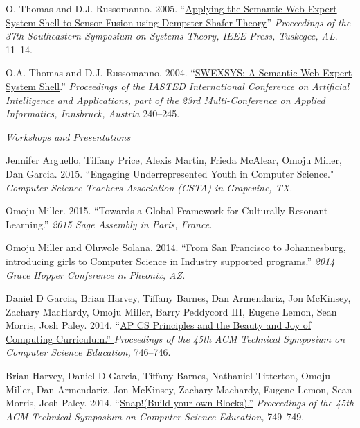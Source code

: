\documentclass[11pt,article,oneside]{memoir}
\begin{document}
\ind O. Thomas and D.J. Russomanno. 2005. ``\href{http://scholar.google.com/citations?view_op=view_citation&hl=en&user=E7z_wrwAAAAJ&citation_for_view=E7z_wrwAAAAJ:d1gkVwhDpl0C}{Applying the Semantic Web Expert System Shell to Sensor Fusion using Dempster-Shafer Theory.}'' \emph{Proceedings of the 37th Southeastern Symposium on Systems Theory, IEEE Press, Tuskegee, AL}. 11--14.

\ind O.A. Thomas and D.J. Russomanno. 2004. ``\href{http://scholar.google.com/citations?view_op=view_citation&hl=en&user=E7z_wrwAAAAJ&citation_for_view=E7z_wrwAAAAJ:2osOgNQ5qMEC}{SWEXSYS: A Semantic Web Expert System Shell}.'' \emph{Proceedings of the IASTED International Conference on Artificial Intelligence and Applications, part of the 23rd Multi-Conference on Applied Informatics, Innsbruck, Austria} 240--245. 

\bigskip

\noindent\emph{Workshops and Presentations  \vspace{0.05in}}


\ind Jennifer Arguello, Tiffany Price, Alexis Martin, Frieda McAlear, Omoju Miller, Dan Garcia. 2015. ``Engaging Underrepresented Youth in Computer Science."  \emph{Computer Science Teachers Association (CSTA) in Grapevine, TX.}

\ind Omoju Miller. 2015. ``Towards a Global Framework for Culturally Resonant Learning.'' \emph{2015 Sage Assembly in Paris, France.} 

\ind Omoju Miller and Oluwole Solana. 2014. ``From San Francisco to Johannesburg, introducing girls to Computer Science in Industry supported programs.'' \emph{2014 Grace Hopper Conference in Pheonix, AZ.}

\ind Daniel D Garcia, Brian Harvey, Tiffany Barnes, Dan Armendariz, Jon McKinsey, Zachary MacHardy, Omoju Miller, Barry Peddycord III, Eugene Lemon, Sean Morris, Josh Paley. 2014. ``\href{http://dl.acm.org/citation.cfm?id=2539026}{AP CS Principles and the Beauty and Joy of Computing Curriculum.'' }\emph{Proceedings of the 45th ACM Technical Symposium on Computer Science Education,} 746--746. 

\ind Brian Harvey, Daniel D Garcia, Tiffany Barnes, Nathaniel Titterton, Omoju Miller, Dan Armendariz, Jon McKinsey, Zachary Machardy, Eugene Lemon, Sean Morris, Josh Paley. 2014. ``\href{http://dl.acm.org/citation.cfm?id=2539022}{Snap!(Build your own Blocks).''} \emph{Proceedings of the 45th ACM Technical Symposium on Computer Science Education,} 749--749. 
\end{document}

